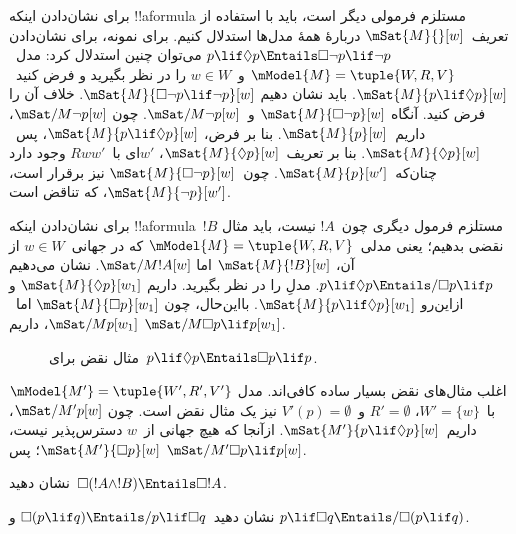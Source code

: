 \documentclass[../../../include/open-logic-section]{subfiles}
\begin{document}
\begin{ex}
  برای نشان‌دادن اینکه !!a{formula} مستلزم فرمولی دیگر است، باید با
  استفاده از تعریف~$\mSat{M}{}[w]$ دربارهٔ همهٔ مدل‌ها استدلال کنیم.
  برای نمونه، برای نشان‌دادن
  $p \lif \Diamond p \Entails \Box\lnot p \lif \lnot p$ می‌توان چنین
  استدلال کرد: مدل~$\mModel{M} = \tuple{W, R,V}$ و~$w \in W$ را در نظر
  بگیرید و فرض کنید~$\mSat{M}{p \lif \Diamond p}[w]$. باید نشان دهیم
  $\mSat{M}{\Box\lnot p \lif \lnot p}[w]$. خلاف آن را فرض کنید. آنگاه
  $\mSat{M}{\Box\lnot p}[w]$ و~$\mSat/{M}{\lnot p}[w]$. چون
  $\mSat/{M}{\lnot p}[w]$، داریم~$\mSat{M}{p}[w]$. بنا بر فرض،
  $\mSat{M}{p \lif \Diamond p}[w]$، پس~$\mSat{M}{\Diamond p}[w]$.
  بنا بر تعریف~$\mSat{M}{\Diamond p}[w]$، $w'$ای با~$Rww'$ وجود دارد
  چنان‌که~$\mSat{M}{p}[w']$. چون~$\mSat{M}{\Box \lnot p}[w]$ نیز
  برقرار است، $\mSat{M}{\lnot p}[w']$، که تناقض است.

  برای نشان‌دادن اینکه !!a{formula}~$!B$ مستلزم فرمول دیگری چون~$!A$
  نیست، باید مثال نقضی بدهیم؛ یعنی مدلی~$\mModel{M} = \tuple{W, R,V}$
  که در جهانی~$w \in W$ از آن، $\mSat{M}{!B}[w]$ اما
  $\mSat/{M}{!A}[w]$. نشان می‌دهیم
  $p \lif \Diamond p \Entails/ \Box p \lif p$. مدلِ
   را در نظر بگیرید. داریم
  $\mSat{M}{\Diamond p}[w_1]$ و ازاین‌رو
  $\mSat{M}{p \lif \Diamond p}[w_1]$. بااین‌حال، چون
  $\mSat{M}{\Box p}[w_1]$ اما~$\mSat/{M}{p}[w_1]$، داریم
  $\mSat/{M}{\Box p \lif p}[w_1]$.
  \begin{figure}
  \begin{center}
  \end{center}
  \caption{مثال نقض برای~$p \lif \Diamond p
  \Entails \Box p \lif p$.}
  \end{figure}
  
  اغلب مثال‌های نقض بسیار ساده کافی‌اند. مدل
  $\mModel{M'} = \tuple{W', R', V'}$ با~$W' = \{w\}$،
  $R' = \emptyset$ و~$V'(p) = \emptyset$ نیز یک مثال نقض است. چون
  $\mSat/{M'}{p}[w]$، داریم~$\mSat{M'}{p \lif \Diamond p}[w]$. ازآنجا
  که هیچ جهانی از~$w$ دسترس‌پذیر نیست، $\mSat{M'}{\Box p}[w]$؛ پس
  $\mSat/{M'}{\Box p \lif p}[w]$.
\end{ex}

\begin{prob}
  نشان دهید~$\Box (!A \land !B) \Entails \Box !A$.
\end{prob}

\begin{prob}
  نشان دهید~$\Box (p \lif q) \Entails/ p \lif \Box q$ و
  $p \lif \Box q \Entails/\Box (p \lif q)$.
\end{prob}
\end{document}
